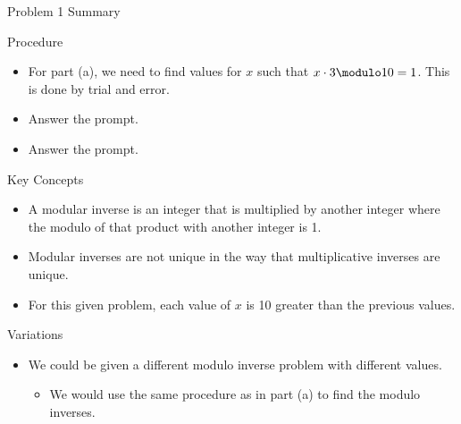 \begin{summary}{Problem 1 Summary}
    \begin{statement}{Procedure}
        \begin{itemize}
            \item For part (a), we need to find values for $x$ such that $x \cdot 3 \modulo 10 = 1$. This is done by trial and error.
            \item Answer the prompt.
            \item Answer the prompt.
        \end{itemize}
    \end{statement}
    \begin{statement}{Key Concepts}
        \begin{itemize}
            \item A modular inverse is an integer that is multiplied by another integer where the modulo of that product with another integer is 1.
            \item Modular inverses are not unique in the way that multiplicative inverses are unique.
            \item For this given problem, each value of $x$ is 10 greater than the previous values.
        \end{itemize}
    \end{statement}
    \begin{statement}{Variations}
        \begin{itemize}
            \item We could be given a different modulo inverse problem with different values.
            \begin{itemize}
                \item We would use the same procedure as in part (a) to find the modulo inverses.
            \end{itemize}
        \end{itemize}
    \end{statement}
\end{summary}

